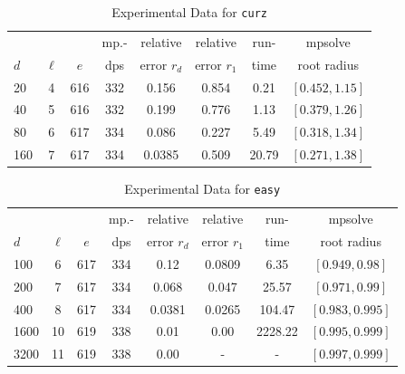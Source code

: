 \documentclass[runningheads]{llncs}
\begin{document}
\begin{table}
\caption{Experimental Data for \texttt{curz}} %
\label{tab:curz}
\vskip -0.15in
\begin{center}
\begin{small}
\begin{sc}
\begin{tabular}{lccccccc}
\toprule
             &  &  & mp.-& relative  & relative & run- & mpsolve \\
$d$& $\ell$& $e$ & dps&error $r_d$       & error $r_1$ &time& root radius\\
\midrule
 20 & 4 & 616 & 332 & 0.156 & 0.854 & 0.21 & $[0.452, 1.15]$\\
 40 & 5 & 616 & 332 & 0.199 & 0.776 & 1.13 & $[0.379, 1.26]$\\
 80 & 6 & 617 & 334 & 0.086 & 0.227 & 5.49 & $[0.318, 1.34]$\\
 160 & 7 & 617 & 334 & 0.0385 & 0.509 & 20.79 & $[0.271, 1.38]$\\
\bottomrule
\end{tabular}
\end{sc}
\end{small}
\end{center}
\vskip 0.05in
\end{table}


\begin{table}
\caption{Experimental Data for \texttt{easy}} %
\label{tab:easy}
\vskip -0.15in
\begin{center}
\begin{small}
\begin{sc}
\begin{tabular}{lccccccc}
\toprule
&  &  & mp.-& relative  & relative & run- & mpsolve \\
$d$& $\ell$& $e$ & dps&error $r_d$       & error $r_1$ &time& root radius\\
\midrule
 100 & 6 & 617 & 334 & 0.12 & 0.0809 & 6.35 & $[0.949, 0.98]$\\
 200 & 7 & 617 & 334 & 0.068 & 0.047 & 25.57 & $[0.971, 0.99]$\\
 400 & 8 & 617 & 334 & 0.0381 & 0.0265 & 104.47 & $[0.983, 0.995]$\\
 1600 &10& 619 & 338 & 0.01 & 0.00 & 2228.22 & $[0.995, 0.999]$\\ %
  3200 &11& 619 & 338 & 0.00 & - & - & $[0.997, 0.999]$\\ %
\bottomrule
\end{tabular}
\end{sc}
\end{small}
\end{center}
\vskip 0.05in
\end{table}
\end{document}
